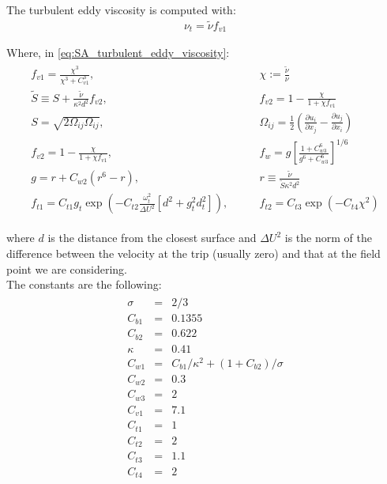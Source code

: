 \documentclass[12pt,twoside]{report}
\renewcommand \pd[2] { \frac{\partial {#1} } {\partial {#2}} }
\begin{document}
The turbulent eddy viscosity is computed with:
\begin{align}
    \nu _{t}={\tilde  {\nu }}f_{{v1}} \label{eq:SA_turbulent_eddy_viscosity}
\end{align}

Where, in \autoref{eq:SA_turbulent_eddy_viscosity}:
\begin{align}
    \begin{split}
        f_{{v1}}={\frac{\chi^{3}}{\chi^{3}+C_{{v1}}^{3}}},& \qquad \chi:={\frac{{\tilde{\nu}}}{\nu}} \\
        \tilde  {S} \equiv S+{\frac  {{\tilde  {\nu }}}{\kappa ^{2}d^{2}}}f_{{v2}},&\qquad f_{{v2}}=1-{\frac  {\chi }{1+\chi f_{{v1}}}} \\
        S={\sqrt  {2\Omega _{{ij}}\Omega _{{ij}}}}, & \qquad \Omega _{{ij}}={\frac{1}{2}} \left( \pd{u_i}{x_j} - \pd{u_j}{x_i} \right) \\
        f_{{v2}}=1-{\frac{\chi}{1+\chi f_{{v1}}}}, & \qquad f_{w}=g\left[{\frac  {1+C_{{w3}}^{6}}{g^{6}+C_{{w3}}^{6}}}\right]^{{1/6}} \\
        g=r+C_{{w2}}(r^{6}-r),&\qquad r\equiv {\frac  {{\tilde  {\nu }}}{{\tilde  {S}}\kappa ^{2}d^{2}}} \\
        f_{{t1}}=C_{{t1}} g_{t}\exp \left(-C_{{t2}}{\frac  {\omega _{t}^{2}}{\Delta U^{2}}}[d^{2}+g_{t}^{2}d_{t}^{2}]\right) , & \qquad f_{{t2}}=C_{{t3}}\exp \left(-C_{{t4}}\chi ^{2}\right) \label{eq:SA_equation_parameters}
    \end{split}
\end{align}

where $d$ is the distance from the closest surface and $\Delta U^{2}$ is the norm of the difference between the velocity at the trip (usually zero) and that at the field point we are considering. \\

The constants are the following:
\begin{gather}
\begin{matrix}
    \sigma &=&2/3 \\
    C_{{b1}}&=&0.1355 \\
    C_{{b2}}&=&0.622 \\
    \kappa &=&0.41 \\
    C_{{w1}}&=&C_{{b1}}/\kappa ^{2}+(1+C_{{b2}})/\sigma \\
    C_{{w2}}&=&0.3 \\
    C_{{w3}}&=&2 \\
    C_{{v1}}&=&7.1 \\
    C_{{t1}}&=&1 \\
    C_{{t2}}&=&2 \\
    C_{{t3}}&=&1.1 \\
    C_{{t4}}&=&2
\end{matrix}
\end{gather}
\end{document}
